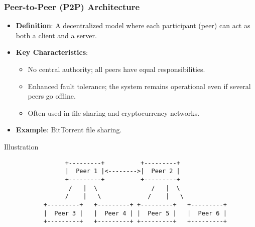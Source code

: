 \documentclass[aspectratio=169]{beamer}
\begin{document}
\begin{frame}[fragile]
    \frametitle{Peer-to-Peer (P2P) Architecture}
    \begin{itemize}
        \item \textbf{Definition}: A decentralized model where each participant (peer) can act as both a client and a server.
        \item \textbf{Key Characteristics}:
        \begin{itemize}
            \item No central authority; all peers have equal responsibilities.
            \item Enhanced fault tolerance; the system remains operational even if several peers go offline.
            \item Often used in file sharing and cryptocurrency networks.
        \end{itemize}
        \item \textbf{Example}: BitTorrent file sharing.
    \end{itemize}
    
    \begin{block}{Illustration}
        \begin{verbatim}
                 +---------+          +---------+
                 |  Peer 1 |<-------->|  Peer 2 |
                 +---------+          +---------+
                  /   |  \               /   |  \
                 /    |   \             /    |   \
           +---------+   +---------+ +---------+   +---------+
           |  Peer 3 |   |  Peer 4 | |  Peer 5 |   |  Peer 6 |
           +---------+   +---------+ +---------+   +---------+
        \end{verbatim}
    \end{block}
\end{frame}
\end{document}
